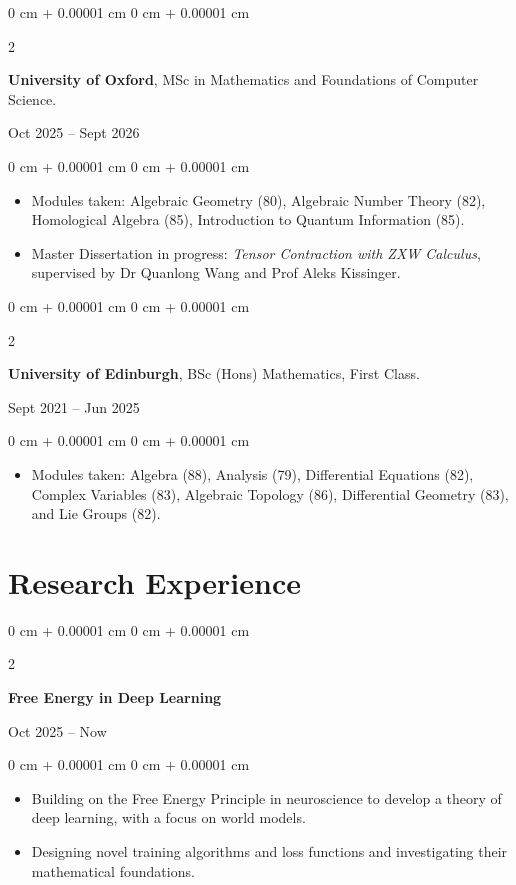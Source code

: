 \documentclass[10pt, a4paper]{article}
\newenvironment{highlights}{
    \begin{itemize}[
        topsep=0.10 cm,
        parsep=0.10 cm,
        partopsep=0pt,
        itemsep=0pt,
        leftmargin=0 cm + 10pt
    ]
}{
    \end{itemize}
} %
\newenvironment{onecolentry}{
    \begin{adjustwidth}{
        0 cm + 0.00001 cm
    }{
        0 cm + 0.00001 cm
    }
}{
    \end{adjustwidth}
} %
\newenvironment{twocolentry}[2][]{
    \onecolentry
    \def\secondColumn{#2}
    \setcolumnwidth{\fill, 4.5 cm}
    \begin{paracol}{2}
}{
    \switchcolumn \raggedleft \secondColumn
    \end{paracol}
    \endonecolentry
} %
\begin{document}
        \begin{twocolentry}{
            Oct 2025 – Sept 2026
        }
            \textbf{University of Oxford}, MSc in Mathematics and Foundations of Computer Science.
		\end{twocolentry}
		\begin{onecolentry}
		\begin{highlights}
                \item Modules taken: Algebraic Geometry (80), Algebraic Number Theory (82), Homological Algebra (85), Introduction to Quantum Information (85).
				\item Master Dissertation in progress: \textit{Tensor Contraction with ZXW Calculus}, supervised by Dr Quanlong Wang and Prof Aleks Kissinger.
            \end{highlights}
        \end{onecolentry}

        \vspace{0.10 cm}

        \begin{twocolentry}{
            Sept 2021 – Jun 2025
        }
            \textbf{University of Edinburgh}, BSc (Hons) Mathematics, First Class. 
		\end{twocolentry}

        \vspace{0.10 cm}
        \begin{onecolentry}
		\begin{highlights}
                \item Modules taken: Algebra (88), Analysis (79), Differential Equations (82), Complex Variables (83), Algebraic Topology (86), Differential Geometry (83), and Lie Groups (82).
            \end{highlights}
        \end{onecolentry}

    

	\section{Research Experience}

		\begin{twocolentry}{
	            Oct 2025 – Now
	        }
				\textbf{Free Energy in Deep Learning} 
			\end{twocolentry}
	        \vspace{0.10 cm}
	        \begin{onecolentry}
	            \begin{highlights}
	                \item Building on the Free Energy Principle in neuroscience to develop a theory of deep learning, with a focus on world models.
					\item Designing novel training algorithms and loss functions and investigating their mathematical foundations.
	            \end{highlights}
	        \end{onecolentry}
\end{document}
